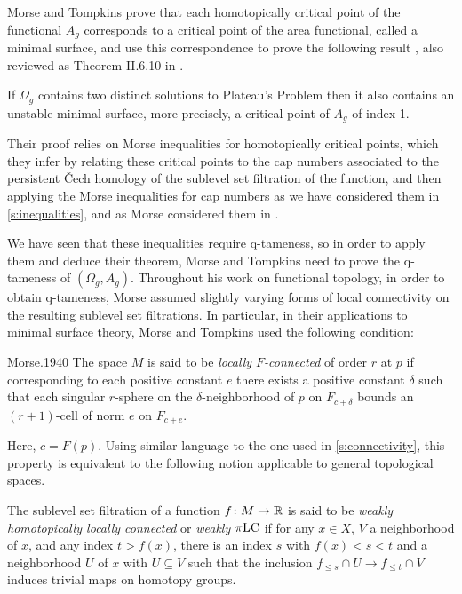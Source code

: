 Morse and Tompkins prove that each homotopically critical point of the functional $A_g$ corresponds to a critical point of the area functional, called a minimal surface, and use this correspondence to prove the following result \cite[p.~447]{Morse.1939}, also reviewed as Theorem II.6.10 in \cite{Struwe.1988}.

\begin{thm}
	If $\Omega_g$ contains two distinct solutions to Plateau's Problem then it also contains an unstable minimal surface, more precisely, a critical point of $A_g$ of index 1.
\end{thm}

Their proof relies on Morse inequalities for homotopically critical points, which they infer by relating these critical points to the cap numbers associated to the persistent \v{C}ech homology of the sublevel set filtration of the function, and then applying the Morse inequalities for cap numbers as we have considered them in \cref{s:inequalities}, and as Morse considered them in \cite{Morse.1940}.

We have seen that these inequalities require q-tameness, so in order to apply them and deduce their theorem, Morse and Tompkins need to prove the \mbox{q-tameness} of $(\Omega_g, A_g)$.
Throughout his work on functional topology, in order to obtain \mbox{q-tameness}, Morse assumed slightly varying forms of local connectivity on the resulting sublevel set filtrations.
In particular, in their applications to minimal surface theory, Morse and Tompkins used the following condition:
\begin{displaycquote}[p.~431]{Morse.1940}
	The space $M$ is said to be \emph{locally $F$-connected} of order $r$ at $p$ if corresponding to each positive constant $e$ there exists a positive constant $\delta$ such that each singular $r$-sphere on the $\delta$-neighborhood of $p$ on $F_{c+\delta}$ bounds an $(r+1)$-cell of norm $e$ on $F_{c+e}$.
\end{displaycquote}
Here, $c = F(p)$.
Using similar language to the one used in \cref{s:connectivity}, this property is equivalent to the following notion applicable to general topological spaces.

\begin{defi}
	The sublevel set filtration of a function $f \colon M \to \mathbb{R}$ is said to be \emph{weakly homotopically locally connected} or \emph{weakly $\pi\mathrm{LC}$}	if for any $x \in X$, $V$ a neighborhood of $x$, and any index $t > f(x)$, there is an index $s$ with $f(x) < s < t$ and a neighborhood $U$ of $x$ with $U \subseteq V$ such that the inclusion $f_{\leq s} \cap U \to f_{\leq t} \cap V$ induces trivial maps on homotopy groups.
\end{defi}

